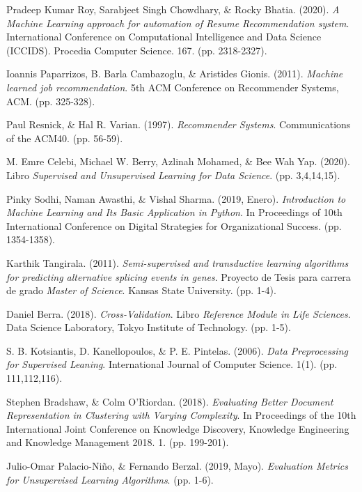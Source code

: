 \documentclass[12pt,a4paper]{article}
\begin{document}
\begin{sloppypar}
\begin{thebibliography}{9}
Pradeep Kumar Roy, Sarabjeet Singh Chowdhary, \& Rocky Bhatia. (2020). \textit{A Machine Learning approach for automation of Resume Recommendation system}. International Conference on Computational Intelligence and Data Science (ICCIDS). Procedia Computer Science. 167. (pp. 2318-2327).

Ioannis Paparrizos, B. Barla Cambazoglu, \& Aristides Gionis. (2011). \textit{Machine learned job recommendation}. 5th ACM Conference on Recommender Systems, ACM. (pp. 325-328).

Paul Resnick, \& Hal R. Varian. (1997). \textit{Recommender Systems}. Communications of the ACM40. (pp. 56-59).

M. Emre Celebi, Michael W. Berry, Azlinah Mohamed, \& Bee Wah Yap. (2020). Libro \textit{Supervised and Unsupervised Learning for Data Science}. (pp. 3,4,14,15).

Pinky Sodhi, Naman Awasthi, \& Vishal Sharma. (2019, Enero). \textit{Introduction to Machine Learning and Its Basic Application in Python}. In Proceedings of 10th International Conference on Digital Strategies for Organizational Success. (pp. 1354-1358).

Karthik Tangirala. (2011). \textit{Semi-supervised and transductive learning algorithms for predicting alternative splicing events in genes}. Proyecto de Tesis para carrera de grado \textit{Master of Science}. Kansas State University. (pp. 1-4).

Daniel Berra. (2018). \textit{Cross-Validation}. Libro \textit{Reference Module in Life Sciences}. Data Science Laboratory, Tokyo Institute of Technology. (pp. 1-5).

S. B. Kotsiantis, D. Kanellopoulos, \& P. E. Pintelas. (2006). \textit{Data Preprocessing for Supervised Leaning}. International Journal of Computer Science. 1(1). (pp. 111,112,116). 

Stephen Bradshaw, \& Colm O’Riordan. (2018). \textit{Evaluating Better Document Representation in Clustering with Varying Complexity}. In Proceedings of the 10th International Joint Conference on Knowledge Discovery, Knowledge Engineering and Knowledge Management 2018. 1. (pp. 199-201).

Julio-Omar Palacio-Niño, \& Fernando Berzal. (2019, Mayo). \textit{Evaluation Metrics for Unsupervised Learning Algorithms}. (pp. 1-6).


\end{thebibliography}
\end{sloppypar}
\end{document}
